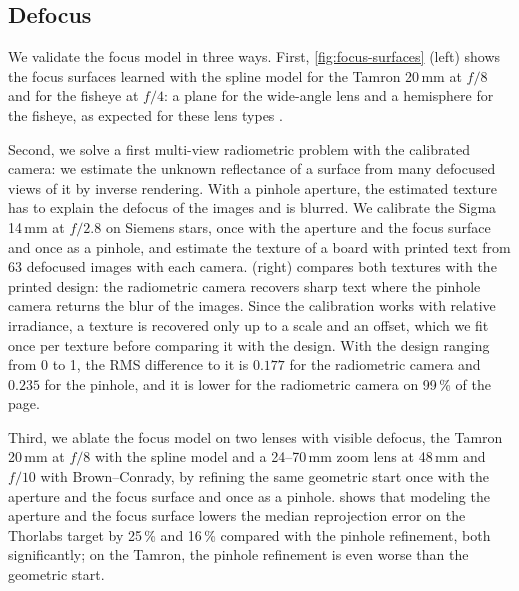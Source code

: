 \subsection{Defocus}
\label{sec:experiment-defocus}
We validate the focus model in three ways. First,
\cref{fig:focus-surfaces} (left) shows the focus surfaces learned with the
spline model for the Tamron 20\,mm at $f/8$ and for the fisheye at
$f/4$: a plane for the wide-angle lens and a hemisphere for the
fisheye, as expected for these lens types
\cite{Kingslake2010,wide-field-of-view-2017}.

Second, we solve a first multi-view radiometric problem with the
calibrated camera: we estimate the unknown reflectance of a surface
from many defocused views of it by inverse rendering. With a pinhole
aperture, the estimated texture has to explain the defocus of the
images and is blurred. We calibrate the Sigma 14\,mm at $f/2.8$ on
Siemens stars, once with the aperture and the focus surface and once
as a pinhole, and estimate the texture of a board with printed text
from 63 defocused images with each camera.  (right)
compares both textures with the printed design: the radiometric
camera recovers sharp text where the pinhole camera returns the blur
of the images. Since the calibration works with relative irradiance,
a texture is recovered only up to a scale and an offset, which we fit
once per texture before comparing it with the design. With the design
ranging from 0 to 1, the RMS difference to it is $0.177$ for the
radiometric camera and $0.235$ for the pinhole, and it is lower for
the radiometric camera on 99\,\% of the page.




Third, we ablate the focus model on two lenses with visible defocus,
the Tamron 20\,mm at $f/8$ with the spline model and a 24--70\,mm zoom
lens at 48\,mm and $f/10$ with Brown--Conrady, by refining the same
geometric start once with the aperture and the focus
surface and once as a pinhole.  shows that modeling
the aperture and the focus surface lowers the median reprojection
error on the Thorlabs target by 25\,\% and 16\,\% compared with the
pinhole refinement, both significantly; on the Tamron, the pinhole
refinement is even worse than the geometric start.
\begin{table}[t]
        \centering
        
        \caption{Defocus ablation on the held-out target: the refinement as a pinhole and with the aperture and the focus surface, and their difference with its 95\,\% bootstrap interval. Bold and italic as in \cref{tab:refinement-chrome}.}
        \label{tab:defocus}
\end{table}
